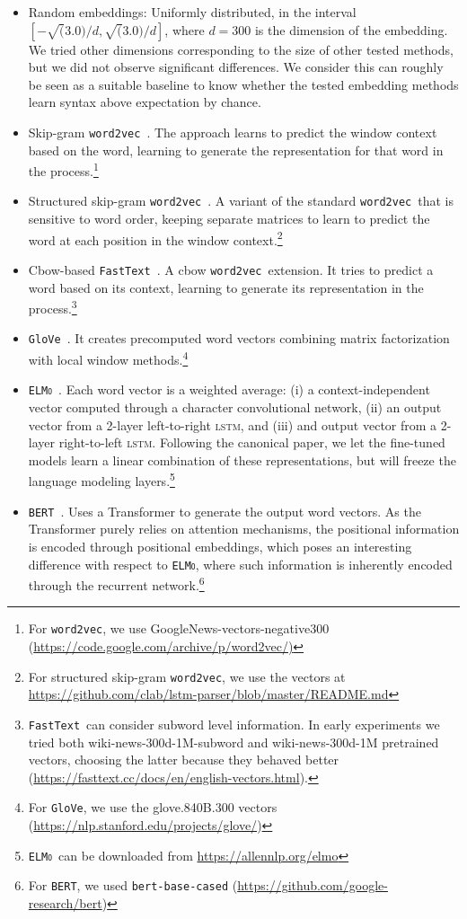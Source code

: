 \documentclass[letterpaper]{article} %
\newcommand{\wordvec}{\texttt{word2vec}}
\newcommand{\fastext}{\texttt{FastText}}
\newcommand{\glove}{\texttt{\textsc{G}lo\textsc{V}e}}
\newcommand{\elmo}{\texttt{\textsc{ELMo}}}
\newcommand{\bert}{\texttt{\textsc{BERT}}}
\begin{document}
\begin{itemize}
    \item Random embeddings: Uniformly distributed, in the interval $[-\sqrt(3.0) / d, \sqrt(3.0) / d]$, where $d=300$ is the dimension of the embedding. We tried other dimensions corresponding to the size of other tested methods, but we did not observe significant differences. We consider this can roughly be seen as a suitable baseline 
    to know whether the tested embedding methods learn syntax above expectation by chance.
    \item {Skip-gram \wordvec}~\cite{mikolov2013distributed}. The approach learns to predict the window context based on the word, learning to generate the representation for that word in the process.\footnote{For \wordvec, we use GoogleNews-vectors-negative300 (\url{https://code.google.com/archive/p/word2vec/)}}
    \item Structured skip-gram \wordvec~\cite{ling2015two}. A variant of the standard \wordvec\ that is sensitive to word order, keeping separate matrices to learn to predict the word at each position in the window context.\footnote{For structured skip-gram \wordvec, we use the vectors at \url{https://github.com/clab/lstm-parser/blob/master/README.md}}
    \item Cbow-based {\fastext}~\cite{bojanowski2017enriching}. A cbow \wordvec\ extension. It tries to predict a word based on its context, learning to generate its representation in the process.\footnote{\fastext\ can consider subword level information. In early experiments we tried both wiki-news-300d-1M-subword and wiki-news-300d-1M pretrained vectors, choosing the latter because they behaved better (\url{https://fasttext.cc/docs/en/english-vectors.html}).}

    \item {\glove}~\cite{pennington2014glove}. It creates precomputed word vectors combining matrix factorization with local window methods.\footnote{For \glove, we use the glove.840B.300 vectors (\url{https://nlp.stanford.edu/projects/glove/})}
 
    \item {\elmo}~\cite{peters2018deep}. Each word vector is a weighted average: (i) a context-independent vector computed through a character convolutional network, (ii) an output vector from a 2-layer left-to-right \textsc{lstm}, and (iii) and output vector from a 2-layer right-to-left \textsc{lstm}. Following the canonical paper, we let the fine-tuned models learn a linear combination of these representations, but will freeze the language modeling layers.\footnote{\elmo\ can be downloaded from \url{https://allennlp.org/elmo}}

\item {\bert}~\cite{devlin2018bert}. Uses a Transformer to generate the output word vectors.
As the Transformer purely relies on attention mechanisms, the positional information is encoded through positional embeddings, which poses an interesting difference with respect to \elmo, where such information is inherently encoded through the recurrent network.\footnote{For \bert, we used \texttt{bert-base-cased} (\url{https://github.com/google-research/bert})}
\end{itemize}
\end{document}
